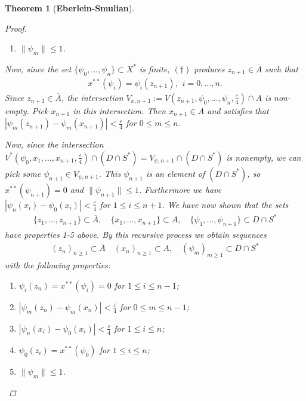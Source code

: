 \documentclass[10pt,twoside,openany,final]{memoir}
\theoremstyle{break}
\newtheorem{theorem}[section]{Theorem}
\theoremstyle{Break}
\newcommand{\lv}{\lVert}
\newcommand{\rv}{\rVert}
\begin{document}
\begin{theorem}[\bfseries{Eberlein-Smulian}]
\begin{proof}
\begin{enumerate}
\item $\lv \psi_{m}\rv \leq 1$.
\end{enumerate}
Now, since the set $\{\psi_{0},\dots,\psi_{n} \}\subset X^{*}$ is finite, $(\dagger)$ produces $z_{n+1} \in \overline{A}$ such that 
\begin{align*}
x^{**}(\psi_{i})=\psi_{i}(z_{n+1}), \ \ i=0,\dots,n.
\end{align*}
Since $z_{n+1} \in \overline{A}$, the intersection $V_{x,n+1}:= V\left(z_{n+1},\psi_{0},\dots,\psi_{n},\frac{\varepsilon}{4}\right) \cap A$ is non-empty. Pick $x_{n+1}$ in this intersection.
Then $x_{n+1} \in A$ and satisfies that $|\psi_{m}(z_{n+1})-\psi_{m}(x_{n+1})|< \frac{\varepsilon}{4}$ for $0\leq m \leq n$.

\noindent Now, since the intersection $V^*\left(\psi_{0},x_{1},\dots,x_{n+1},\frac{\varepsilon}{4}\right) \cap \left( D \cap S^*\right)=V_{\psi,n+1} \cap \left( D \cap S^*\right) $ is nonempty, we can pick some $\psi_{n+1} \in V_{\psi,n+1}$.
This $\psi_{n+1}$ is an element of $\left( D \cap S^*\right)$, so $x^{**}(\psi_{n+1})=0$ and $\lv \psi_{n+1} \rv \leq 1$. Furthermore we have $|\psi_{n}(x_{i})-\psi_{0}(x_{i})| < \frac{\varepsilon}{4}$ for $1 \leq i \leq n+1$.
We have now shown that the sets 
\begin{align*}
\{z_{1},\dots,z_{n+1}\} \subset \overline{A}, \quad \{ x_{1},\dots,x_{n+1}\} \subset A, \quad \{\psi_{1},\dots,\psi_{n+1}\} \subset D\cap S^*
\end{align*}
have properties 1-5 above. By this recursive process we obtain sequences
\begin{align*}
(z_{n})_{n \geq 1} \subset \bar{A} \quad (x_{n})_{n \geq 1} \subset A, \quad (\psi_{m})_{m\geq 1} \subset D \cap S^*
\end{align*}
with the following properties:
\begin{enumerate}
\item $\psi_{i}(z_{n})=x^{**}(\psi_{i})=0$ for $1 \leq i \leq n-1$;
\item $|\psi_{m}(z_{n})-\psi_{m}(x_{n})| < \frac{\varepsilon}{4}$ for $0 \leq m \leq n-1$;
\item $|\psi_{n}(x_{i})-\psi_{0}(x_{i})| < \frac{\varepsilon}{4}$ for $1 \leq i \leq n$;
\item $\psi_{0}(z_{i})=x^{**}(\psi_{0})$ for $1 \leq i \leq n$;
\item $\lv \psi_{m}\rv \leq 1$.
\end{enumerate}


\end{proof}
\end{theorem}
\end{document}
